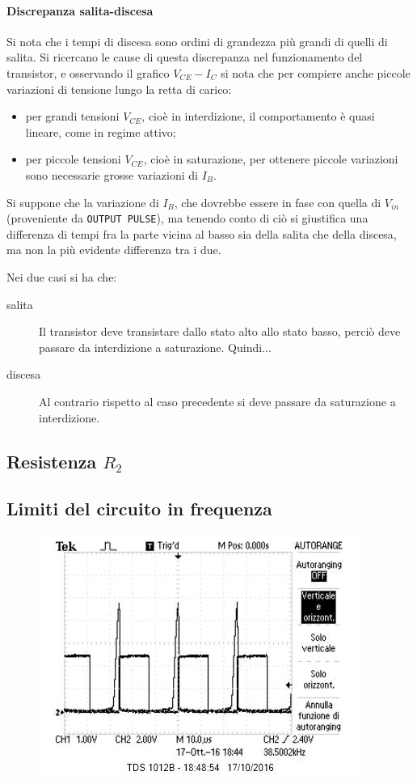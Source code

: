 \documentclass[10pt,a4paper]{article}
\def\code#1{\texttt{#1}}
\begin{document}
\paragraph{Discrepanza salita-discesa} Si nota che i tempi di discesa sono ordini di grandezza più grandi di quelli di salita. Si ricercano le cause di questa discrepanza nel funzionamento del transistor, e osservando il grafico $V_{CE} - I_C$ si nota che per compiere anche piccole variazioni di tensione lungo la retta di carico:
\begin{itemize}
\item per grandi tensioni $V_{CE}$, cioè in interdizione, il comportamento è quasi lineare, come in regime attivo;
\item per piccole tensioni $V_{CE}$, cioè in saturazione, per ottenere piccole variazioni sono necessarie grosse variazioni di $I_B$.
\end{itemize}
Si suppone che la variazione di $I_B$, che dovrebbe essere in fase con quella di $V_{in}$ (proveniente da \code{OUTPUT PULSE}), ma tenendo conto di ciò si giustifica una differenza di tempi fra la parte vicina al basso sia della salita che della discesa, ma non la più evidente differenza tra i due.



Nei due casi si ha che:
\begin{description}
\item[salita] Il transistor deve transistare dallo stato alto allo stato basso, perciò deve passare da interdizione a saturazione. Quindi...
\item[discesa] Al contrario rispetto al caso precedente si deve passare da saturazione a interdizione.
\end{description}

\subsection{Resistenza $R_2$}

\subsection{Limiti del circuito in frequenza}

\begin{figure}[h!]
\centering
\includegraphics{../oscilloscopio/raise_problem.jpg}
\caption{}
\end{figure}
\end{document}
